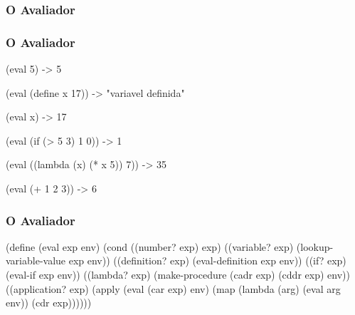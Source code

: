 
\begin{frame}[fragile]
  \frametitle{O Avaliador}
\end{frame}

\begin{frame}[fragile]
  \frametitle{O Avaliador}
    \begin{code}
      (eval 5) -> 5
    \end{code}
    \pause
    \begin{code}
      (eval (define x 17)) -> "variavel definida"
    \end{code}
    \pause
    \begin{code}
      (eval x) -> 17
    \end{code}
    \pause
    \begin{code}
      (eval (if (> 5 3) 1 0)) -> 1
    \end{code}
    \pause
    \begin{code}
      (eval ((lambda (x) (* x 5)) 7)) -> 35
    \end{code}
    \pause
    \begin{code}
      (eval (+ 1 2 3)) -> 6
    \end{code}
\end{frame}

\begin{frame}[fragile]
  \frametitle{O Avaliador}
  \begin{code}
(define (eval exp env)
  (cond
    ((number? exp)      exp)
    ((variable? exp)    (lookup-variable-value exp env))
    ((definition? exp)  (eval-definition exp env))
    ((if? exp)          (eval-if exp env))
    ((lambda? exp)      (make-procedure (cadr exp)
                                        (cddr exp) env))
    ((application? exp) (apply (eval (car exp) env)
                               (map (lambda (arg)
                                            (eval arg env))
                                    (cdr exp))))))
  \end{code}
\end{frame}